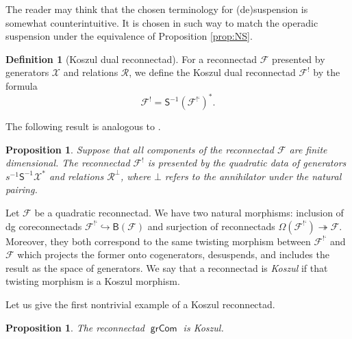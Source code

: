 \documentclass[11pt]{article}
\newtheorem{prop}[theo]{Proposition}
\theoremstyle{definition}
\newtheorem{defi}[theo]{Definition}
\numberwithin{equation}{section}
\newcommand\calF{\mathcal{F}}
\newcommand\calR{\mathcal{R}}
\newcommand\calX{\mathcal{X}}
\DeclareMathOperator{\grCom}{\mathsf{grCom}}
\begin{document}
The reader may think that the chosen terminology for (de)suspension is somewhat counterintuitive. It is chosen in such way to match the operadic suspension under the equivalence of Proposition \ref{prop:NS}. 

\begin{defi}[Koszul dual reconnectad]
For a reconnectad $\calF$ presented by generators $\calX$ and relations $\calR$, we define the Koszul dual reconnectad $\calF^!$ by the formula
 \[
\calF^!=\mathsf{S}^{-1}(\calF^{\text{!`}})^*.
 \]
\end{defi} 

The following result is analogous to \cite[Prop.~7.2.4]{MR2954392}.

\begin{prop}
Suppose that all components of the reconnectad $\calF$ are finite dimensional. The reconnectad $\calF^!$ is presented by the quadratic data of generators $s^{-1}\mathsf{S}^{-1}\calX^*$ and relations $\calR^\bot$, where $\bot$ refers to the annihilator under the natural pairing. 
\end{prop}

Let $\calF$ be a quadratic reconnectad. We have two natural morphisms: inclusion of dg coreconnectads $\calF^{\text{!`}} \hookrightarrow \mathsf{B}(\calF)$ and surjection of reconnectads $\Omega(\calF^{\text{!`}}) \twoheadrightarrow \calF$. Moreover, they both correspond to the same twisting morphism between $\calF^{\text{!`}}$ and $\calF$ which projects the former onto cogenerators, desuspends, and includes the result as the space of generators. We say that a reconnectad is \emph{Koszul} if that twisting morphism is a Koszul morphism.

Let us give the first nontrivial example of a Koszul reconnectad. 

\begin{prop}\label{prop:cobar-associahedra}
The reconnectad $\grCom$ is Koszul.
\end{prop}
\end{document}
